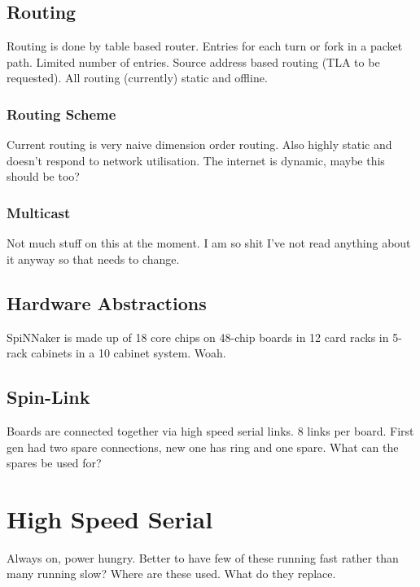 		\subsection{Routing}
			
			Routing is done by table based router. Entries for each turn or fork in a
			packet path. Limited number of entries. Source address based routing (TLA
			to be requested). All routing (currently) static and offline.
			
			\subsubsection{Routing Scheme}
				
				Current routing is very naive dimension order routing. Also highly
				static and doesn't respond to network utilisation. The internet is
				dynamic, maybe this should be too?
			
			\subsubsection{Multicast}
				
				Not much stuff on this at the moment. I am so shit I've not read
				anything about it anyway so that needs to change.
			
		
		\subsection{Hardware Abstractions}
			
			SpiNNaker is made up of 18 core chips on 48-chip boards in 12 card racks
			in 5-rack cabinets in a 10 cabinet system. Woah.
		
		\subsection{Spin-Link}
			
			Boards are connected together via high speed serial links. 8 links per
			board. First gen had two spare connections, new one has ring and one
			spare. What can the spares be used for?
	
	
	\section{High Speed Serial}
		
		Always on, power hungry. Better to have few of these running fast rather
		than many running slow? Where are these used. What do they replace.
